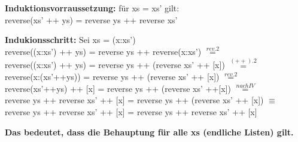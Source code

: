 \documentclass[11pt]{article}
\begin{document}
\begin{enumerate}
\begin{enumerate}
\vspace*{0.5cm}
\textbf{Induktionsvorraussetzung:} für xs = xs' gilt:\\
reverse(xs' ++ ys) = reverse ys ++ reverse xs'

\vspace*{0.5cm}
\textbf{Indukionsschritt:} Sei xs = (x:xs')\\
reverse((x:xs') ++ ys) = reverse ys ++ reverse(x:xs') $\stackrel{rev.2}{=}$\\
reverse((x:xs') ++ ys) = reverse ys ++ (reverse xs' ++ [x]) $\stackrel{(++).2}{=}$\\
reverse(x:(xs'++ys)) = reverse ys ++ (reverse xs' ++ [x]) $\stackrel{rev.2}{=}$\\
reverse(xs'++ys) ++ [x] = reverse ys ++ (reverse xs' ++[x]) $\stackrel{nach IV}{=}$\\
reverse ys ++ reverse xs' ++ [x] = reverse ys ++ (reverse xs' ++ [x]) $\equiv$\\
reverse ys ++ reverse xs' ++ [x] = reverse ys ++ reverse xs' ++ [x]

\vspace*{0.5cm}
\textbf{Das bedeutet, dass die Behauptung für alle xs (endliche Listen) gilt.}
\end{enumerate}
\end{enumerate}
\end{document}
